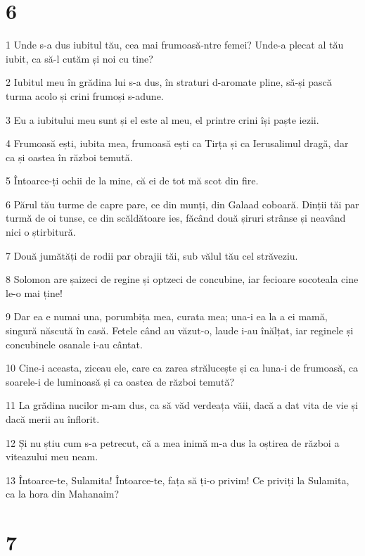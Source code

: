 \chapter{6}

\par 1 Unde s-a dus iubitul tău, cea mai frumoasă-ntre femei? Unde-a plecat al tău iubit, ca să-l cutăm și noi cu tine?
\par 2 Iubitul meu în grădina lui s-a dus, în straturi d-aromate pline, să-și pască turma acolo și crini frumoși s-adune.
\par 3 Eu a iubitului meu sunt și el este al meu, el printre crini își paște iezii.
\par 4 Frumoasă ești, iubita mea, frumoasă ești ca Tirța și ca Ierusalimul dragă, dar ca și oastea în război temută.
\par 5 Întoarce-ți ochii de la mine, că ei de tot mă scot din fire.
\par 6 Părul tău turme de capre pare, ce din munți, din Galaad coboară. Dinții tăi par turmă de oi tunse, ce din scăldătoare ies, făcând două șiruri strânse și neavând nici o știrbitură.
\par 7 Două jumătăți de rodii par obrajii tăi, sub vălul tău cel străveziu.
\par 8 Solomon are șaizeci de regine și optzeci de concubine, iar fecioare socoteala cine le-o mai ține!
\par 9 Dar ea e numai una, porumbița mea, curata mea; una-i ea la a ei mamă, singură născută în casă. Fetele când au văzut-o, laude i-au înălțat, iar reginele și concubinele osanale i-au cântat.
\par 10 Cine-i aceasta, ziceau ele, care ca zarea strălucește și ca luna-i de frumoasă, ca soarele-i de luminoasă și ca oastea de război temută?
\par 11 La grădina nucilor m-am dus, ca să văd verdeața văii, dacă a dat vita de vie și dacă merii au înflorit.
\par 12 Și nu știu cum s-a petrecut, că a mea inimă m-a dus la oștirea de război a viteazului meu neam.
\par 13 Întoarce-te, Sulamita! Întoarce-te, fața să ți-o privim! Ce priviți la Sulamita, ca la hora din Mahanaim?

\chapter{7}

